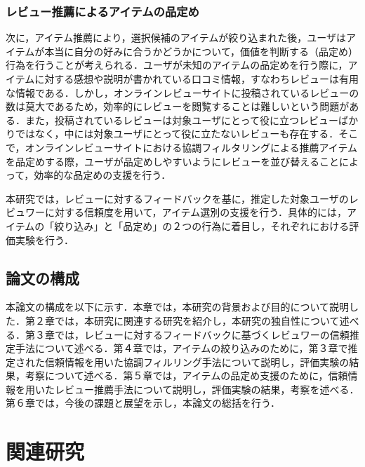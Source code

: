 \documentclass[a4paper,11pt,oneside,openany]{jsbook}
\begin{document}
\subsection{レビュー推薦によるアイテムの品定め}
次に，アイテム推薦により，選択候補のアイテムが絞り込まれた後，ユーザはアイテムが本当に自分の好みに合うかどうかについて，価値を判断する（品定め）行為を行うことが考えられる．ユーザが未知のアイテムの品定めを行う際に，アイテムに対する感想や説明が書かれている口コミ情報，すなわちレビューは有用な情報である．しかし，オンラインレビューサイトに投稿されているレビューの数は莫大であるため，効率的にレビューを閲覧することは難しいという問題がある．また，投稿されているレビューは対象ユーザにとって役に立つレビューばかりではなく，中には対象ユーザにとって役に立たないレビューも存在する．そこで，オンラインレビューサイトにおける協調フィルタリングによる推薦アイテムを品定めする際，ユーザが品定めしやすいようにレビューを並び替えることによって，効率的な品定めの支援を行う．
\par
本研究では，レビューに対するフィードバックを基に，推定した対象ユーザのレビュワーに対する信頼度を用いて，アイテム選別の支援を行う．具体的には，アイテムの「絞り込み」と「品定め」の２つの行為に着目し，それぞれにおける評価実験を行う．

	\section{論文の構成}
本論文の構成を以下に示す．本章では，本研究の背景および目的について説明した．第２章では，本研究に関連する研究を紹介し，本研究の独自性について述べる．第３章では，レビューに対するフィードバックに基づくレビュワーの信頼推定手法について述べる．第４章では，アイテムの絞り込みのために，第３章で推定された信頼情報を用いた協調フィルリング手法について説明し，評価実験の結果，考察について述べる．第５章では，アイテムの品定め支援のために，信頼情報を用いたレビュー推薦手法について説明し，評価実験の結果，考察を述べる．第６章では，今後の課題と展望を示し，本論文の総括を行う．



\chapter{関連研究}
\end{document}
